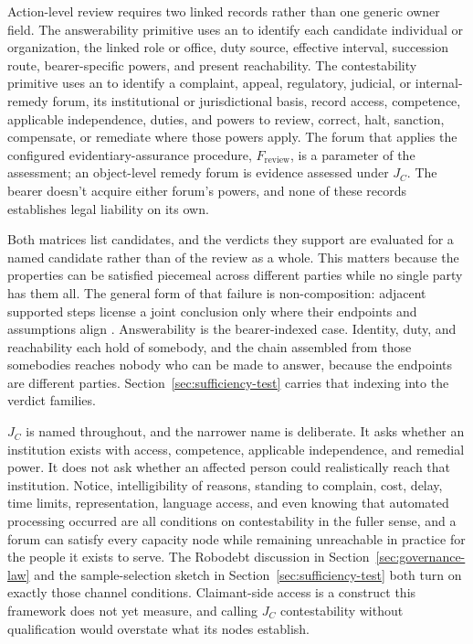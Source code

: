 Action-level review requires two linked records rather than one generic owner field. The answerability primitive uses an  to identify each candidate individual or organization, the linked role or office, duty source, effective interval, succession route, bearer-specific powers, and present reachability. The contestability primitive uses an  to identify a complaint, appeal, regulatory, judicial, or internal-remedy forum, its institutional or jurisdictional basis, record access, competence, applicable independence, duties, and powers to review, correct, halt, sanction, compensate, or remediate where those powers apply. The forum that applies the configured evidentiary-assurance procedure, \(F_{\mathrm{review}}\), is a parameter of the assessment; an object-level remedy forum is evidence assessed under \(J_C\). The bearer doesn't acquire either forum's powers, and none of these records establishes legal liability on its own.

Both matrices list candidates, and the verdicts they support are evaluated for a named candidate rather than of the review as a whole. This matters because the properties can be satisfied piecemeal across different parties while no single party has them all. The general form of that failure is non-composition: adjacent supported steps license a joint conclusion only where their endpoints and assumptions align \citep{reynolds2026nonComposition}. Answerability is the bearer-indexed case. Identity, duty, and reachability each hold of somebody, and the chain assembled from those somebodies reaches nobody who can be made to answer, because the endpoints are different parties. Section~\ref{sec:sufficiency-test} carries that indexing into the verdict families.

\(J_C\) is named  throughout, and the narrower name is deliberate. It asks whether an institution exists with access, competence, applicable independence, and remedial power. It does not ask whether an affected person could realistically reach that institution. Notice, intelligibility of reasons, standing to complain, cost, delay, time limits, representation, language access, and even knowing that automated processing occurred are all conditions on contestability in the fuller sense, and a forum can satisfy every capacity node while remaining unreachable in practice for the people it exists to serve. The Robodebt discussion in Section~\ref{sec:governance-law} and the sample-selection sketch in Section~\ref{sec:sufficiency-test} both turn on exactly those channel conditions. Claimant-side access is a construct this framework does not yet measure, and calling \(J_C\) contestability without qualification would overstate what its nodes establish.

